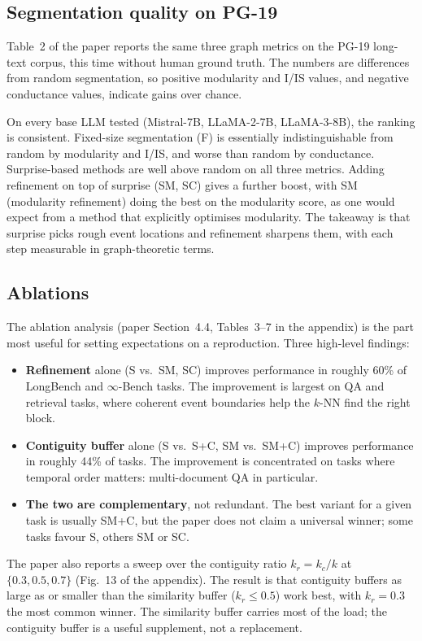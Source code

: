 \subsection{Segmentation quality on PG-19}
\label{sec:eval-segmentation}

Table~2 of the paper reports the same three graph metrics on the PG-19 long-text corpus, this time without human ground truth. The numbers are differences from random segmentation, so positive modularity and I/IS values, and negative conductance values, indicate gains over chance.

On every base LLM tested (Mistral-7B, LLaMA-2-7B, LLaMA-3-8B), the ranking is consistent. Fixed-size segmentation (F) is essentially indistinguishable from random by modularity and I/IS, and worse than random by conductance. Surprise-based methods are well above random on all three metrics. Adding refinement on top of surprise (SM, SC) gives a further boost, with SM (modularity refinement) doing the best on the modularity score, as one would expect from a method that explicitly optimises modularity. The takeaway is that surprise picks rough event locations and refinement sharpens them, with each step measurable in graph-theoretic terms.

\subsection{Ablations}
\label{sec:eval-ablations}

The ablation analysis (paper Section~4.4, Tables~3--7 in the appendix) is the part most useful for setting expectations on a reproduction. Three high-level findings:
\begin{itemize}
  \item \textbf{Refinement} alone (S vs.\ SM, SC) improves performance in roughly 60\% of LongBench and $\infty$-Bench tasks. The improvement is largest on QA and retrieval tasks, where coherent event boundaries help the $k$-NN find the right block.
  \item \textbf{Contiguity buffer} alone (S vs.\ S+C, SM vs.\ SM+C) improves performance in roughly 44\% of tasks. The improvement is concentrated on tasks where temporal order matters: multi-document QA in particular.
  \item \textbf{The two are complementary}, not redundant. The best variant for a given task is usually SM+C, but the paper does not claim a universal winner; some tasks favour S, others SM or SC.
\end{itemize}
The paper also reports a sweep over the contiguity ratio $k_r = k_c / k$ at $\{0.3, 0.5, 0.7\}$ (Fig.~13 of the appendix). The result is that contiguity buffers as large as or smaller than the similarity buffer ($k_r \le 0.5$) work best, with $k_r = 0.3$ the most common winner. The similarity buffer carries most of the load; the contiguity buffer is a useful supplement, not a replacement.
